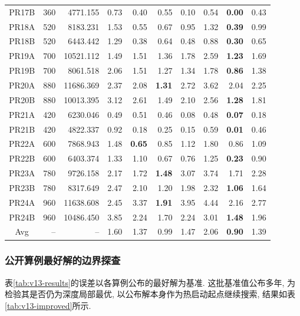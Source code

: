 \documentclass{setp-new}
\begin{document}
\begin{table}[H]
\begin{tabular*}{\linewidth}{@{\extracolsep{\fill}}crrrrr@{\hspace{8pt}}rr@{\hspace{8pt}}rr@{}}
PR17B & 360 & 4771.155 & 0.73 & 0.40 & 0.55 & 0.10 & 0.54 & \textbf{0.00} & 0.43 \\
PR18A & 520 & 8183.231 & 1.53 & 0.55 & 0.67 & 0.95 & 1.32 & \textbf{0.39} & 0.99 \\
PR18B & 520 & 6443.442 & 1.29 & 0.38 & 0.64 & 0.48 & 0.88 & \textbf{0.30} & 0.65 \\
PR19A & 700 & 10521.112 & 1.49 & 1.51 & 1.36 & 1.78 & 2.59 & \textbf{1.23} & 1.69 \\
PR19B & 700 & 8061.518 & 2.06 & 1.51 & 1.27 & 1.34 & 1.78 & \textbf{0.86} & 1.38 \\
PR20A & 880 & 11686.369 & 2.37 & 2.08 & \textbf{1.31} & 2.72 & 3.62 & 2.04 & 2.25 \\
PR20B & 880 & 10013.395 & 3.12 & 2.61 & 1.49 & 2.10 & 2.56 & \textbf{1.28} & 1.81 \\
PR21A & 420 & 6230.046 & 0.49 & 0.51 & 0.46 & 0.08 & 0.48 & \textbf{0.07} & 0.18 \\
PR21B & 420 & 4822.337 & 0.92 & 0.18 & 0.25 & 0.15 & 0.59 & \textbf{0.01} & 0.46 \\
PR22A & 600 & 7868.943 & 1.48 & \textbf{0.65} & 0.85 & 1.12 & 1.80 & 0.86 & 1.09 \\
PR22B & 600 & 6403.374 & 1.33 & 1.10 & 0.67 & 0.76 & 1.25 & \textbf{0.23} & 0.90 \\
PR23A & 780 & 9726.158 & 2.17 & 1.72 & \textbf{1.48} & 3.07 & 3.74 & 1.71 & 2.28 \\
PR23B & 780 & 8317.649 & 2.47 & 2.10 & 1.20 & 1.98 & 2.32 & \textbf{1.06} & 1.64 \\
PR24A & 960 & 11638.608 & 2.45 & 3.37 & \textbf{1.91} & 3.95 & 4.44 & 2.16 & 2.77 \\
PR24B & 960 & 10486.450 & 3.85 & 2.24 & 1.70 & 2.24 & 3.01 & \textbf{1.48} & 1.96 \\
Avg & -- & -- & 1.60 & 1.37 & 0.99 & 1.47 & 2.06 & \textbf{0.90} & 1.39 \\
\bottomrule
\end{tabular*}
\end{table}

\subsubsection{公开算例最好解的边界探查}

表\ref{tab:v13-results}的误差以各算例公布的最好解为基准.
这批基准值公布多年, 为检验其是否仍为深度局部最优,
以公布解本身作为热启动起点继续搜索, 结果如表\ref{tab:v13-improved}所示.
\end{document}
